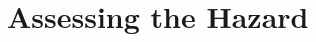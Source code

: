 \documentclass[12pt,oneside]{book}
\begin{document}



\section{Assessing the Hazard}
\label{sec:assessing_the_hazard}
\end{document}
